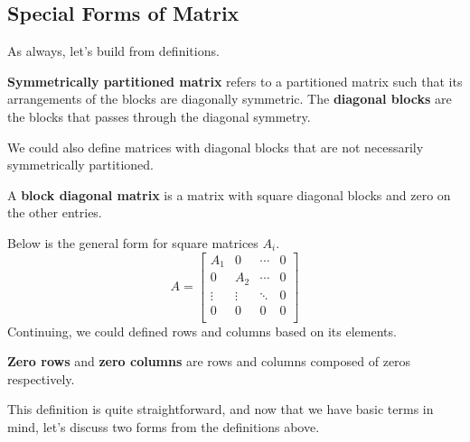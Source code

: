 \documentclass[../main.tex]{subfiles}
\begin{document}
\subsection{Special Forms of Matrix}

As always, let's build from definitions.

\begin{definition}
\textbf{Symmetrically partitioned matrix} refers to a partitioned
matrix such that its arrangements of the blocks are diagonally
symmetric. The \textbf{diagonal blocks} are the blocks that passes
through the diagonal symmetry.
\end{definition}

We could also define matrices with diagonal blocks that are not
necessarily symmetrically partitioned.

\begin{definition}
A \textbf{block diagonal matrix} is a matrix with square diagonal
blocks and zero on the other entries.
\end{definition}

Below is the general form for square matrices $A_i$.
\[
A =
\begin{bmatrix}
    A_1    & 0      & \cdots & 0 \\
    0      & A_2    & \cdots & 0 \\
    \vdots & \vdots & \ddots & 0 \\
    0      & 0      & 0      & 0 \\
\end{bmatrix}
\]
Continuing, we could defined rows and columns based on its elements.

\begin{definition}
\textbf{Zero rows} and \textbf{zero columns} are rows and columns
composed of zeros respectively.
\end{definition}

This definition is quite straightforward, and now that we have
basic terms in mind, let's discuss two forms from the definitions
above.
\end{document}
